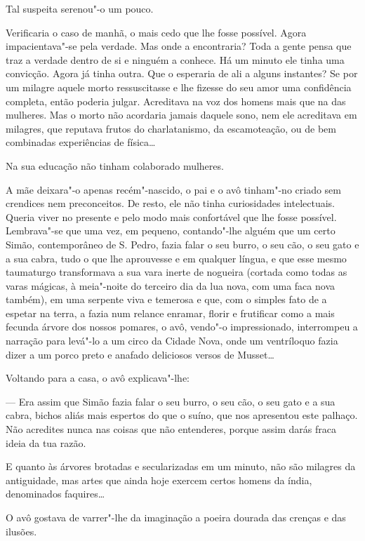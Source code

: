 Tal suspeita serenou"-o um pouco.

Verificaria o caso de manhã, o mais cedo que lhe fosse possível. Agora
impacientava"-se pela verdade. Mas onde a encontraria? Toda a gente pensa
que traz a verdade dentro de si e ninguém a conhece. Há um minuto ele
tinha uma convicção. Agora já tinha outra. Que o esperaria de ali a
alguns instantes? Se por um milagre aquele morto ressuscitasse e lhe
fizesse do seu amor uma confidência completa, então poderia julgar.
Acreditava na voz dos homens mais que na das mulheres. Mas o morto não
acordaria jamais daquele sono, nem ele acreditava em milagres, que
reputava frutos do charlatanismo, da escamoteação, ou de bem combinadas
experiências de física\ldots{}

Na sua educação não tinham colaborado mulheres.

A mãe deixara"-o apenas recém"-nascido, o pai e o avô tinham"-no criado sem
crendices nem preconceitos. De resto, ele não tinha curiosidades
intelectuais. Queria viver no presente e pelo modo mais confortável que
lhe fosse possível. Lembrava"-se que uma vez, em pequeno, contando"-lhe
alguém que um certo Simão, contemporâneo de S. Pedro, fazia falar o seu
burro, o seu cão, o seu gato e a sua cabra, tudo o que lhe aprouvesse e
em qualquer língua, e que esse mesmo taumaturgo transformava a sua vara
inerte de nogueira (cortada como todas as varas mágicas, à meia"-noite do
terceiro dia da lua nova, com uma faca nova também), em uma serpente
viva e temerosa e que, com o simples fato de a espetar na terra, a fazia
num relance enramar, florir e frutificar como a mais fecunda árvore dos
nossos pomares, o avô, vendo"-o impressionado, interrompeu a narração
para levá"-lo a um circo da Cidade Nova, onde um ventríloquo fazia dizer
a um porco preto e anafado deliciosos versos de Musset\ldots{}

Voltando para a casa, o avô explicava"-lhe:

--- Era assim que Simão fazia falar o seu burro, o seu cão, o seu gato e
a sua cabra, bichos aliás mais espertos do que o suíno, que nos
apresentou este palhaço. Não acredites nunca nas coisas que não
entenderes, porque assim darás fraca ideia da tua razão.

E quanto às árvores brotadas e secularizadas em um minuto, não são
milagres da antiguidade, mas artes que ainda hoje exercem certos homens
da índia, denominados faquires\ldots{}

O avô gostava de varrer"-lhe da imaginação a poeira dourada das crenças e
das ilusões.

